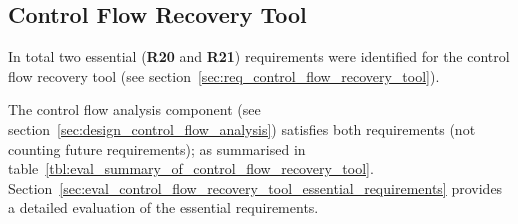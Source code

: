 
\subsection{Control Flow Recovery Tool}

In total two essential (\textbf{R20} and \textbf{R21}) requirements were identified for the control flow recovery tool (see section~\ref{sec:req_control_flow_recovery_tool}).

The control flow analysis component (see section~\ref{sec:design_control_flow_analysis}) satisfies both requirements (not counting future requirements); as summarised in table~\ref{tbl:eval_summary_of_control_flow_recovery_tool}. Section~\ref{sec:eval_control_flow_recovery_tool_essential_requirements} provides a detailed evaluation of the essential requirements.

\begin{table}[htbp]
	\begin{center}
	\end{center}
	\caption{A summary of the evaluation against requirements of the control flow recovery tool, which specifies what requirements (abbreviated as ``Req.'') that have been satisfied (abbreviated as ``Sat.'').}
	\label{tbl:eval_summary_of_control_flow_recovery_tool}
\end{table}



